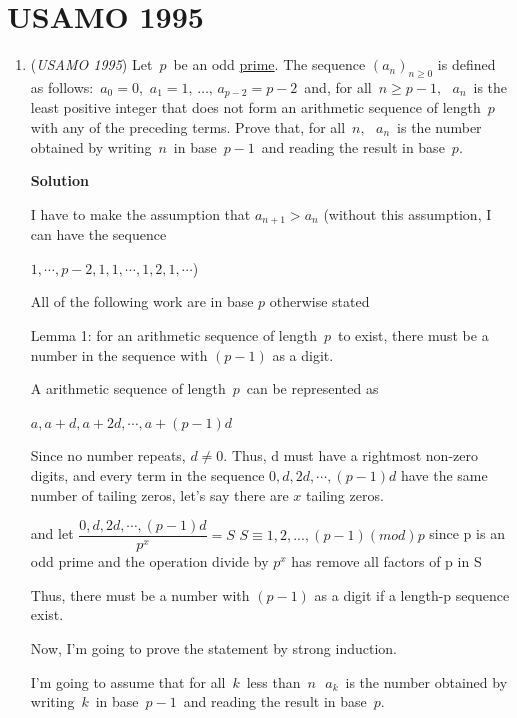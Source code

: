 \section{USAMO 1995}
        \begin{enumerate}
        	\item (\textit{USAMO 1995}) Let $\, p \,$ be an odd \href{https://artofproblemsolving.com/wiki/index.php?title=Prime}{prime}.  The sequence $(a_n)_{n \geq 0}$ is defined as follows: $\, a_0 = 0,$ $a_1 = 1, \, \ldots, \, a_{p-2} = p-2 \,$ and, for all $\, n \geq p-1, \,$ $\, a_n \,$ is the least positive integer that does not form an arithmetic sequence of length $\, p \,$ with any of the preceding terms. Prove that, for all $\, n, \,$ $\, a_n \,$ is the number obtained by writing $\, n \,$ in base $\, p-1 \,$ and reading the result in base $\, p$.


 



\textbf{Solution}

I have to make the assumption that $a_{n+1}>a_{n}$ (without this assumption, I can have the sequence

 ${1,\cdots,p-2,1,1,\cdots,1,2,1,\cdots}$)

 All of the following work are in base $p$ otherwise stated

 


 Lemma 1: for an arithmetic sequence of length $\, p \,$ to exist, there must be a number in the sequence with $(p-1)$ as a digit.

 A arithmetic sequence of length $\, p \,$ can be represented as

 $a,a+d,a+2d,\cdots,a+(p-1)d$

 Since no number repeats, $d\neq0$. Thus, d must have a rightmost non-zero digits, and every term in the sequence $0,d,2d,\cdots,(p-1)d$ have the same number of tailing zeros, let's say there are $x$ tailing zeros.

 and let $\dfrac{{0,d,2d,\cdots,(p-1)d}}{p^x}=S$
$S\equiv{1,2,...,(p-1)}(mod)p$ since p is an odd prime and the operation divide by $p^x$ has remove all factors of p in S

 Thus, there must be a number with $(p-1)$ as a digit if a length-p sequence exist.

 


 Now, I'm going to prove the statement by strong induction.

 I'm going to assume that for all $\, k \,$  less than $\, n \,$
$\, a_k \,$ is the number obtained by writing $\, k \,$ in base $\, p-1 \,$ and reading the result in base $\, p$.


\end{enumerate}
